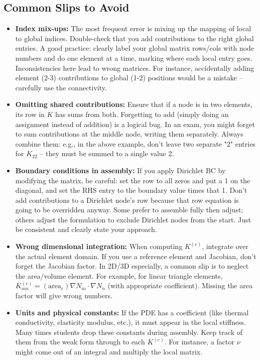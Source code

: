 \documentclass[a4paper,11pt]{article}
\begin{document}
\subsection{Common Slips to Avoid}

\begin{itemize}
    \item \textbf{Index mix-ups:} The most frequent error is mixing up the mapping of local to global indices. Double-check that you add contributions to the right global entries. A good practice: clearly label your global matrix rows/cols with node numbers and do one element at a time, marking where each local entry goes. Inconsistencies here lead to wrong matrices. For instance, accidentally adding element (2-3) contributions to global (1-2) positions would be a mistake -- carefully use the connectivity.

    \item \textbf{Omitting shared contributions:} Ensure that if a node is in two elements, its row in $K$ has sums from both. Forgetting to add (simply doing an assignment instead of addition) is a logical bug. In an exam, you might forget to sum contributions at the middle node, writing them separately. Always combine them: e.g., in the above example, don't leave two separate "2" entries for $K_{22}$ -- they must be summed to a single value 2.

    \item \textbf{Boundary conditions in assembly:} If you apply Dirichlet BC by modifying the matrix, be careful: set the row to all zeros and put a 1 on the diagonal, and set the RHS entry to the boundary value times that 1. Don't add contributions to a Dirichlet node's row because that row equation is going to be overridden anyway. Some prefer to assemble fully then adjust; others adjust the formulation to exclude Dirichlet nodes from the start. Just be consistent and clearly state your approach.

    \item \textbf{Wrong dimensional integration:} When computing $K^{(e)}$, integrate over the actual element domain. If you use a reference element and Jacobian, don't forget the Jacobian factor. In 2D/3D especially, a common slip is to neglect the area/volume element. For example, for linear triangle elements, $K^{(e)}_{mn} = (\text{area}_e)\nabla N_m \cdot \nabla N_n$ (with appropriate coefficient). Missing the area factor will give wrong numbers.

    \item \textbf{Units and physical constants:} If the PDE has a coefficient (like thermal conductivity, elasticity modulus, etc.), it must appear in the local stiffness. Many times students drop these constants during assembly. Keep track of them from the weak form through to each $K^{(e)}$. For instance, a factor $\nu$ might come out of an integral and multiply the local matrix.


\end{itemize}
\end{document}
